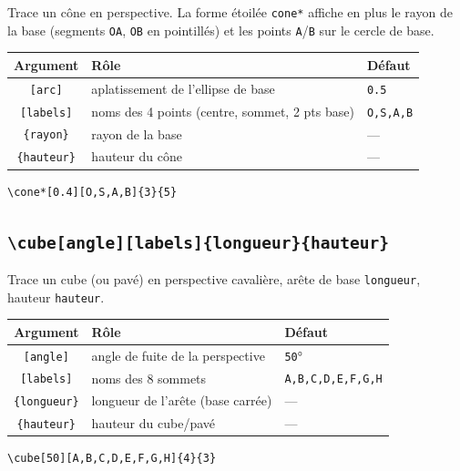 \documentclass[11pt,a4paper]{article}
\newcommand{\cmdname}[1]{\texttt{\textbackslash#1}}
\begin{document}
Trace un cône en perspective. La forme étoilée \texttt{cone*} affiche en plus le rayon de la base (segments \texttt{OA}, \texttt{OB} en pointillés) et les points \texttt{A}/\texttt{B} sur le cercle de base.

\begin{center}
\begin{tabular}{@{}cll@{}}
\toprule
\textbf{Argument} & \textbf{Rôle} & \textbf{Défaut} \\
\midrule
\texttt{[arc]} & aplatissement de l'ellipse de base & \texttt{0.5} \\
\texttt{[labels]} & noms des 4 points (centre, sommet, 2 pts base) & \texttt{O,S,A,B} \\
\texttt{\{rayon\}} & rayon de la base & --- \\
\texttt{\{hauteur\}} & hauteur du cône & --- \\
\bottomrule
\end{tabular}
\end{center}

\begin{lstlisting}
\cone*[0.4][O,S,A,B]{3}{5}
\end{lstlisting}

\subsection{\cmdname{cube[angle][labels]\{longueur\}\{hauteur\}}}

Trace un cube (ou pavé) en perspective cavalière, arête de base \texttt{longueur}, hauteur \texttt{hauteur}.

\begin{center}
\begin{tabular}{@{}cll@{}}
\toprule
\textbf{Argument} & \textbf{Rôle} & \textbf{Défaut} \\
\midrule
\texttt{[angle]} & angle de fuite de la perspective & \texttt{50}° \\
\texttt{[labels]} & noms des 8 sommets & \texttt{A,B,C,D,E,F,G,H} \\
\texttt{\{longueur\}} & longueur de l'arête (base carrée) & --- \\
\texttt{\{hauteur\}} & hauteur du cube/pavé & --- \\
\bottomrule
\end{tabular}
\end{center}

\begin{lstlisting}
\cube[50][A,B,C,D,E,F,G,H]{4}{3}
\end{lstlisting}
\end{document}
